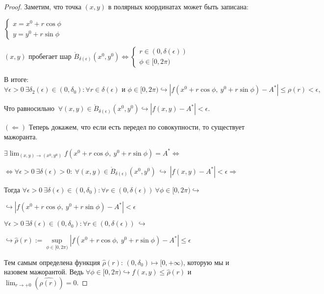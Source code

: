 \begin{enumerate}
\begin{proposition}
\begin{proof}
Заметим, что точка $(x, y)$ в полярных координатах может быть записана:

$    \begin{cases}
        x = x^0 + r \cos\phi\\
        y = y^0 +  r \sin\phi&
    \end{cases}$

    $(x, y) \text{ пробегает шар } \mathring{B}_{\delta(\epsilon)}(x^0, y^0) \Longleftrightarrow 
        \begin{cases}
        r \in (0, \delta(\epsilon))\\
        \phi \in [0, 2\pi)&
    \end{cases}
    $

    В итоге:
    $$\forall \epsilon > 0  \ \exists \delta_2(\epsilon) \in (0, \delta_0): \forall r \in \delta(\epsilon) \text{ и } \phi \in [0, 2\pi) \hookrightarrow |f(x^0 + r \cos\phi, \ y^0 +  r \sin\phi) - A^{*}| \leq \rho(r) < \epsilon,$$

    Что равносильно $\ \forall (x, y) \in \mathring{B}_{\delta(\epsilon)}(x^0, y^0) \hookrightarrow |f(x, y) - A^{*}| < \epsilon.$

    $(\Longleftarrow)$ Теперь докажем, что если есть передел по совокупности, то существует мажоранта.

    $\exists \lim_{(x, y) \to (x^0, y^0)} f(x^0 + r \cos\phi, \ y^0 +  r \sin\phi) = A^{*}  \Longleftrightarrow$
    \begin{flushright}
            $\Longleftrightarrow \forall \epsilon > 0 \  \exists \delta(\epsilon) > 0: \ \forall (x, y)  \in \mathring{B}_{\delta(\epsilon)}(x^0, y^0) \  \hookrightarrow \ |f(x, y) - A^{*}| < \epsilon \Longrightarrow
    $
    \end{flushright}

    Тогда $\forall \epsilon > 0  \ \exists \delta(\epsilon) \in (0, \delta_0):  \forall r \in (0, \delta(\epsilon)) \ \forall \phi \in [0, 2\pi) \hookrightarrow$
    \begin{flushright}
        $\hookrightarrow |f(x^0 + r \cos\phi, \ y^0 +  r \sin\phi) - A^{*}|< \epsilon$
    \end{flushright}

    $\forall \epsilon > 0\ \exists \delta(\epsilon) \in (0, \delta_0):  \forall r \in (0, \delta(\epsilon)) \  \hookrightarrow $
    \begin{flushright}
            $ \hookrightarrow 
    \hat{\rho}(r) :=
    \underset{\phi \in [0, 2\pi)}{\sup}|f(x^0 + r \cos\phi, \ y^0 +  r \sin\phi) - A^{*}| \leq \epsilon$
    \end{flushright}

    Тем самым определена функция $\hat{\rho}(r)$: $(0, \delta_{0}) \mapsto [0, +\infty)$, которую мы и назовем мажорантой. Ведь $ \forall \phi \in [0, 2\pi) \hookrightarrow f(x, y) \leq \hat{\rho}(r)$ и $\lim_{r \to +0} (\hat{\rho(r)}) = 0.$
    
\end{proof}

\end{proposition}
\end{enumerate}


